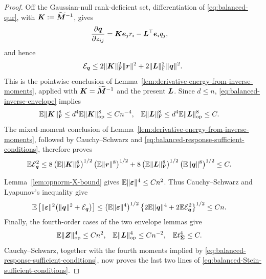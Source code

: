 \documentclass{article}
\theoremstyle{plain} %
\theoremstyle{definition} %
\theoremstyle{definition} %
\begin{document}
\begin{proof}
Off the Gaussian-null rank-deficient set, differentiation of
\eqref{eq:balanced-qur}, with $\boldsymbol{K}:=\widetilde{\boldsymbol{M}}^{-1}$, gives
\begin{align}
    \pdv{\boldsymbol{q}}{z_{ij}}
    &=\boldsymbol{K}\boldsymbol{e}_jr_i-\boldsymbol{L}^\top\boldsymbol{e}_iq_j,
    \label{eq:balanced-dot-q}
\end{align}
and hence
\begin{align}
    {\mathcal E}_{\boldsymbol{q}}
    \leq
      2\lVert\boldsymbol{K}\rVert_{\rm F}^2\lVert\boldsymbol{r}\rVert^2
      +2\lVert\boldsymbol{L}\rVert_{\rm F}^2\lVert\boldsymbol{q}\rVert^2.
    \label{eq:balanced-Dq-energy}
\end{align}
This is the pointwise conclusion of
Lemma~\ref{lem:derivative-energy-from-inverse-moments}, applied with
$\boldsymbol{K}=\widetilde{\boldsymbol{M}}^{-1}$ and the present $\boldsymbol{L}$.
Since $d\leq n$, \eqref{eq:balanced-inverse-envelope} implies
\begin{align*}
    {\mathbb{E}}\lVert\boldsymbol{K}\rVert_{\rm F}^{8}
    &\leq d^4{\mathbb{E}}\lVert\boldsymbol{K}\rVert_{\rm op}^{8}\leq Cn^{-4},
    &
    {\mathbb{E}}\lVert\boldsymbol{L}\rVert_{\rm F}^{8}
    &\leq d^4{\mathbb{E}}\lVert\boldsymbol{L}\rVert_{\rm op}^{8}\leq C.
\end{align*}
The mixed-moment conclusion of
Lemma~\ref{lem:derivative-energy-from-inverse-moments}, followed by
Cauchy--Schwarz and \eqref{eq:balanced-response-sufficient-conditions},
therefore proves
\begin{align*}
    {\mathbb{E}}{\mathcal E}_{\boldsymbol{q}}^2
    &\leq
      8\left({\mathbb{E}}\lVert\boldsymbol{K}\rVert_{\rm F}^{8}\right)^{1/2}
        \left({\mathbb{E}}\lVert\boldsymbol{r}\rVert^{8}\right)^{1/2}
      +8\left({\mathbb{E}}\lVert\boldsymbol{L}\rVert_{\rm F}^{8}\right)^{1/2}
        \left({\mathbb{E}}\lVert\boldsymbol{q}\rVert^{8}\right)^{1/2}
      \leq C.
\end{align*}

Lemma~\ref{lem:opnorm-X-bound} gives
${\mathbb{E}}\lVert{\boldsymbol{\varepsilon} }\rVert^{4}\leq Cn^2$.  Thus Cauchy--Schwarz and Lyapunov's
inequality give
\begin{align*}
    {\mathbb{E}}\left[
       \lVert{\boldsymbol{\varepsilon} }\rVert^{2}
       \bigl(\lVert\boldsymbol{q}\rVert^{2}+{\mathcal E}_{\boldsymbol{q}}\bigr)
    \right]
    &\leq
    \left({\mathbb{E}}\lVert{\boldsymbol{\varepsilon} }\rVert^{4}\right)^{1/2}
    \left\{2{\mathbb{E}}\lVert\boldsymbol{q}\rVert^{4}+2{\mathbb{E}}{\mathcal E}_{\boldsymbol{q}}^{2}\right\}^{1/2}
    \leq Cn.
\end{align*}
Finally, the fourth-order cases of the two envelope lemmas give
\begin{align*}
    {\mathbb{E}}\lVert\boldsymbol{Z}\rVert_{\rm op}^{4}&\leq Cn^2,
    & {\mathbb{E}}\lVert\boldsymbol{L}\rVert_{\rm op}^{4}&\leq Cn^{-2},
    & {\mathbb{E}} t_{\boldsymbol{\Sigma}}^{4}&\leq C.
\end{align*}
Cauchy--Schwarz, together with the fourth moments implied by
\eqref{eq:balanced-response-sufficient-conditions}, now proves the last two
lines of \eqref{eq:balanced-Stein-sufficient-conditions}.


\end{proof}
\end{document}
